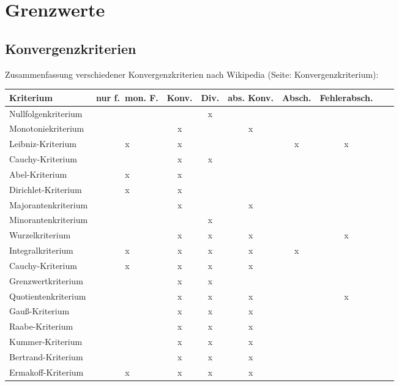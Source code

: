\chapter{Grenzwerte}
\section{Konvergenzkriterien}
Zusammenfassung verschiedener Konvergenzkriterien nach Wikipedia (Seite: Konvergenzkriterium):
\begin{center}
    \begin{tabular}{lcccccccp{2cm}}
         \toprule
         Kriterium & {nur f.\ mon. F.} & Konv. & Div. & abs. Konv. & Absch. & Fehlerabsch.\\
         \midrule
         Nullfolgenkriterium &  &  & x &  &  & \\
         Monotoniekriterium &  & x &  & x &  & \\
         Leibniz-Kriterium & x & x &  &  & x & x\\
         Cauchy-Kriterium &  & x & x &  &  & \\
         Abel-Kriterium & x & x &  &  &  & \\
         Dirichlet-Kriterium & x & x &  &  &  & \\
         Majorantenkriterium &  & x &  & x &  & \\
         Minorantenkriterium &  &  & x &  &  & \\
         Wurzelkriterium &  & x & x & x &  & x\\
         Integralkriterium & x & x & x & x & x & \\
         Cauchy-Kriterium & x & x & x & x &  & \\
         Grenzwertkriterium &  & x & x &  &  & \\
         Quotientenkriterium &  & x & x & x &  & x\\
         Gauß-Kriterium &  & x & x & x &  & \\
         Raabe-Kriterium &  & x & x & x &  & \\
         Kummer-Kriterium &  & x & x & x &  & \\
         Bertrand-Kriterium &  & x & x & x &  & \\
         Ermakoff-Kriterium & x & x & x & x &  & \\
         \bottomrule
    \end{tabular}
\end{center}

\pagebreak
